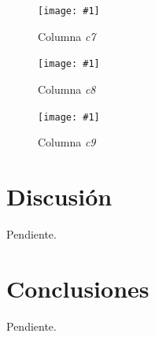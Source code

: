 \documentclass[a4paper, 10pt, twoside]{article}
\newcommand{\grafico}[3]{
  \begin{figure}[H]
    \texttt{[image: \#1]}
    \caption{#2}
    \label{#3}
  \end{figure}
}
\begin{document}
\grafico{dataset-c7}
        {Columna \emph{c7}}
        {dataset-columna-c7}

\grafico{dataset-c8}
        {Columna \emph{c8}}
        {dataset-columna-c8}

\grafico{dataset-c9}
        {Columna \emph{c9}}
        {dataset-columna-c9}




\section{Discusión}

Pendiente.




\section{Conclusiones}

Pendiente.
\end{document}
